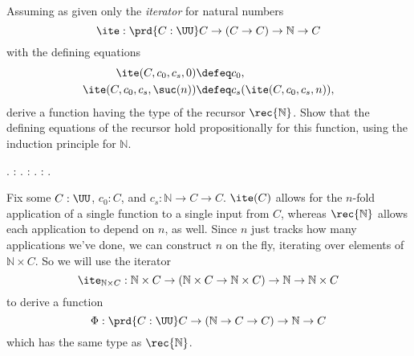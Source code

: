 Assuming as given only the \textit{iterator} for natural numbers
\[
\ite : 
\prd{C:\UU} C \to (C \to C) \to \mathbb{N} \to C
\]
with the defining equations
\begin{align*}
\ite(C, c_{0}, c_{s}, 0) &\defeq c_{0}, \\
\ite(C, c_{0}, c_{s}, \suc(n)) &\defeq c_{s}(\ite(C, c_{0}, c_{s}, n)),
\end{align*}
derive a function having the type of the recursor $\rec{\mathbb{N}}$.  Show
that the defining equations of the recursor hold propositionally for this
function, using the induction principle for $\mathbb{N}$. \begin{coqdoccode}
\coqdocemptyline
\coqdocnoindent
{} .\coqdoceol
\coqdocemptyline
\coqdocindent{1.00em}
  : .\coqdoceol
\coqdocindent{1.00em}
  : .\coqdoceol
\coqdocindent{1.00em}
  :     .\coqdoceol
\coqdocemptyline
\end{coqdoccode}
\soln  
    Fix some $C : \UU$, $c_{0} : C$, and $c_{s} : \mathbb{N} \to C \to C$.
    $\ite(C)$ allows for the $n$-fold application of a single function to a single
    input from $C$, whereas $\rec{\mathbb{N}}$ allows each application to depend on
    $n$, as well.  Since $n$ just tracks how many applications we've done, we can
    construct $n$ on the fly, iterating over elements of $\mathbb{N} \times C$.  So
    we will use the iterator
    \[
    \ite_{\mathbb{N} \times C} : \mathbb{N} \times C \to (\mathbb{N} \times C
    \to \mathbb{N} \times C) \to \mathbb{N} \to \mathbb{N} \times C
    \]
    to derive a function
    \[
    \Phi : \prd{C : \UU} C \to (\mathbb{N} \to C \to C) \to
    \mathbb{N} \to C
    \]
    which has the same type as $\rec{\mathbb{N}}$.  


